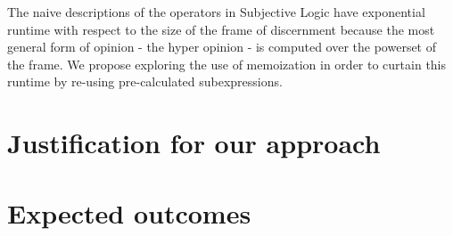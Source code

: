 \documentclass[a4paper]{article}
\begin{document}
\par
The naive descriptions of the operators in Subjective Logic have exponential runtime with respect
to the size of the frame of discernment because the most general form of opinion - the hyper
opinion - is computed over the powerset of the frame. We propose exploring the use of memoization
in order to curtain this runtime by re-using pre-calculated subexpressions.


\section{Justification for our approach}


\section{Expected outcomes}
\end{document}

